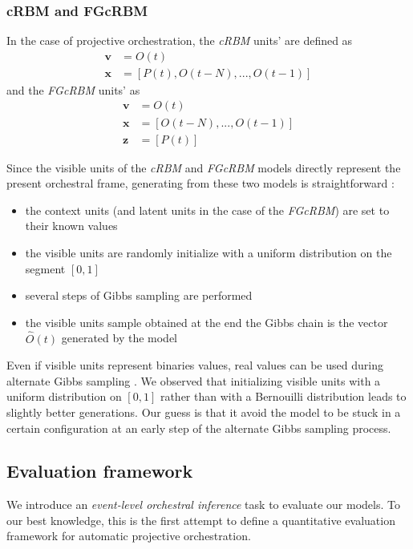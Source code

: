 \documentclass{article}
\begin{document}
\subsubsection{cRBM and FGcRBM}
In the case of projective orchestration, the \textit{cRBM} units' are defined as
\begin{align*}
\bm{v} &= O(t) \\
\bm{x} &= \left[P(t), O(t-N), ..., O(t-1)\right]
\end{align*}
and the \textit{FGcRBM} units' as
 \begin{align*}
 \bm{v} &= O(t) \\
 \bm{x} &= \left[O(t-N), ..., O(t-1)\right]\\
 \bm{z} &= \left[P(t)\right]
 \end{align*}
 
Since the visible units of the \textit{cRBM} and \textit{FGcRBM} models directly represent the present orchestral frame, generating from these two models is straightforward : 
\begin{itemize}
	\item the context units (and latent units in the case of the \textit{FGcRBM}) are set to their known values
 	\item the visible units are randomly initialize with a uniform distribution on the segment $[0,1]$
 	\item several steps of Gibbs sampling are performed
 	\item the visible units sample obtained at the end the Gibbs chain is the vector $\hat{O}(t)$ generated by the model
 \end{itemize}
 Even if visible units represent binaries values, real values can be used during alternate Gibbs sampling \cite{hinton2010practical}. We observed that initializing visible units with a uniform distribution on $[0,1]$ rather than with a Bernouilli distribution leads to slightly better generations. Our guess is that it avoid the model to be stuck in a certain configuration at an early step of the alternate Gibbs sampling process.

\subsection{Evaluation framework}
We introduce an \textit{event-level orchestral inference} task to evaluate our models. To our best knowledge, this is the first attempt to define a quantitative evaluation framework for automatic projective orchestration.
\end{document}
